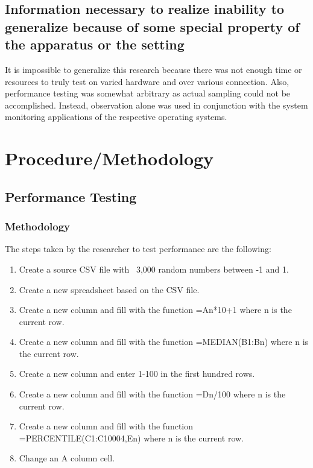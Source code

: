 \documentclass[12pt,oneside,letterpaper,titlepage]{article}
\begin{document}
\subsection{Information necessary to realize inability to generalize because of some special property of the apparatus or the setting}

It is impossible to generalize this research because there was not enough time
or resources to truly test on varied hardware and over various connection.
Also, performance testing was somewhat arbitrary as actual sampling could not be
accomplished.  Instead, observation alone was used in conjunction with the
system monitoring applications of the respective operating systems.

\section{Procedure/Methodology}

\subsection{Performance Testing}

\subsubsection{Methodology}


The steps taken by the researcher to test performance are the following:

\begin{enumerate}

\item Create a source CSV file with ~3,000 random numbers between -1 and 1.

\item Create a new spreadsheet based on the CSV file.

\item Create a new column and fill with the function =An*10+1 where n is the
  current row.

\item Create a new column and fill with the function =MEDIAN(B1:Bn) where n is
  the current row.

\item Create a new column and enter 1-100 in the first hundred rows.

\item Create a new column and fill with the function =Dn/100 where n is the
  current row.

\item Create a new column and fill with the function =PERCENTILE(C1:C10004,En)
  where n is the current row.

\item Change an A column cell.

\end{enumerate}
\end{document}
